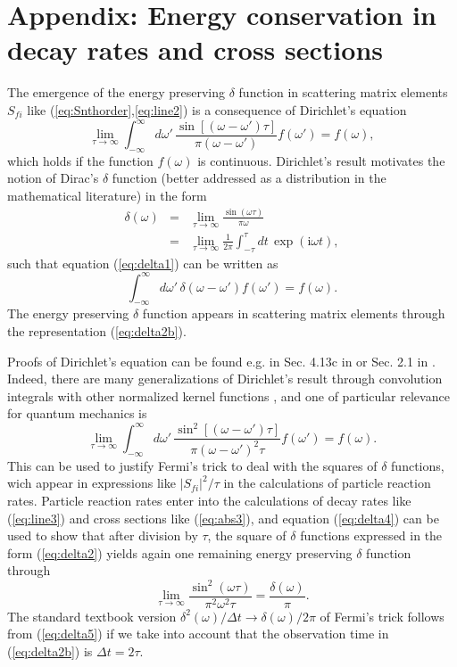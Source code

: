 \documentclass[final,3p,times,twocolumn]{elsarticle3}
\begin{document}
\section*{Appendix: Energy conservation in
decay rates and cross sections}
The emergence of the energy preserving $\delta$ function in scattering 
matrix elements $S_{\! fi}$ like (\ref{eq:Snthorder},\ref{eq:line2}) is a 
consequence of Dirichlet's equation \cite{CH,courant}
\begin{equation}\label{eq:delta1}
\lim_{\tau\to\infty}\int_{-\infty}^\infty\!d\omega'\,
\frac{\sin[(\omega-\omega')\tau]}{\pi(\omega-\omega')}f(\omega')
=f(\omega),
\end{equation}
which holds if the function $f(\omega)$ is continuous. Dirichlet's result 
motivates the notion of Dirac's $\delta$ function
(better addressed as a distribution in the mathematical
literature) in the form
\begin{eqnarray}\label{eq:delta2}
\delta(\omega)
&=&\lim_{\tau\to\infty}\frac{\sin(\omega\tau)}{\pi\omega}
\\ \label{eq:delta2b}
&=&\lim_{\tau\to\infty}\frac{1}{2\pi}\int_{-\tau}^{\tau}\!
dt\,\exp(\mathrm{i}\omega t),
\end{eqnarray}
such that equation (\ref{eq:delta1}) can 
be written as 
\begin{equation}\label{eq:delta3}
\int_{-\infty}^\infty\!d\omega'\,\delta(\omega-\omega')f(\omega')
=f(\omega).
\end{equation}
The energy preserving $\delta$ function appears in scattering matrix 
elements through the representation (\ref{eq:delta2b}).

Proofs of Dirichlet's equation can be found e.g. in Sec. 4.13c
in \cite{courant} or Sec. 2.1 in \cite{rdqm}. Indeed, there are
many generalizations of Dirichlet's result through convolution
integrals with other normalized kernel functions \cite{rdqm}, 
and one of particular relevance for quantum mechanics is
\begin{equation}\label{eq:delta4}
\lim_{\tau\to\infty}\int_{-\infty}^\infty\!d\omega'\,
\frac{\sin^2[(\omega-\omega')\tau]}{\pi(\omega-\omega')^2\tau}f(\omega')
=f(\omega).
\end{equation}
This can be used to justify Fermi's trick to deal with the squares
of $\delta$ functions, wich appear in expressions like $|S_{fi}|^2/\tau$
in the calculations of particle reaction rates.
Particle reaction rates enter into the
calculations of decay rates like (\ref{eq:line3}) and cross sections 
like (\ref{eq:abs3}), and equation (\ref{eq:delta4}) can be used to
show that after division by $\tau$, the square of $\delta$ functions 
expressed in the form (\ref{eq:delta2}) yields again one remaining energy 
preserving $\delta$ function through
\begin{equation}\label{eq:delta5}
\lim_{\tau\to\infty}\frac{\sin^2(\omega\tau)}{\pi^2\omega^2\tau}
=\frac{\delta(\omega)}{\pi}.
\end{equation}
The standard textbook 
version $\delta^2(\omega)/\Delta t\to\delta(\omega)/2\pi$ of Fermi's 
trick follows from (\ref{eq:delta5}) if we take into account that the
observation time in  (\ref{eq:delta2b}) is $\Delta t=2\tau$.
\end{document}
